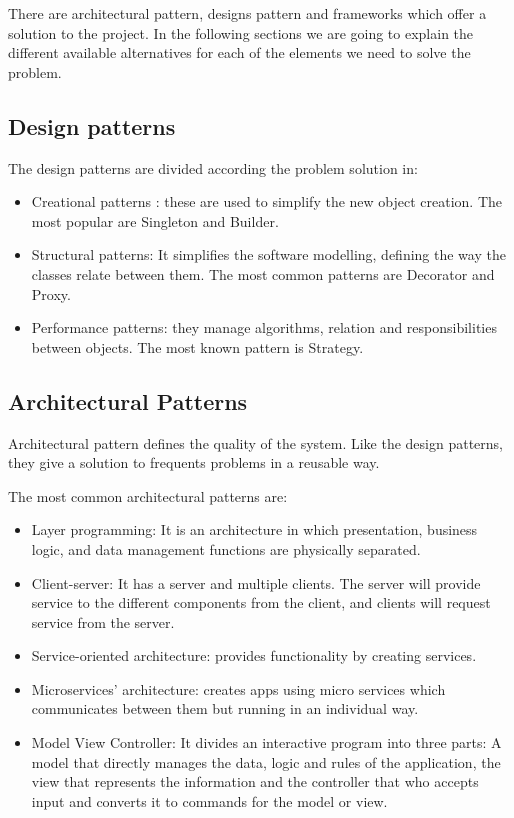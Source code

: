 \documentclass[12pt]{report} %
\begin{document}
There are architectural pattern, designs pattern and frameworks which offer a solution to the project. In the following sections we are going to explain the different available alternatives for each of the elements we need to solve the problem.


\subsection{Design patterns}

The design patterns are divided according the problem solution in:

\begin{itemize}
	\item Creational patterns : these are used to simplify the new object creation. The most popular are Singleton and Builder.
	\item Structural patterns: It simplifies the software modelling, defining the way the classes relate between them. The most common patterns are Decorator and Proxy.
	\item Performance patterns: they manage algorithms, relation and responsibilities between objects. The most known pattern is Strategy.	
\end{itemize}

\subsection{Architectural Patterns}

Architectural pattern defines the quality of the system. Like the design patterns, they give a solution to frequents problems in a reusable way. 

The most common architectural patterns are:
\begin{itemize}
	\item Layer programming: It is an architecture in which presentation, business logic, and data management functions are physically separated.
	\item Client-server: It has a server and multiple clients. The server will provide service to the different components from the client, and clients will request service from the server.
	\item Service-oriented architecture: provides functionality by creating services. 
	\item Microservices' architecture: creates apps using micro services which communicates between them but running in an individual way.
	\item Model View Controller:  It divides an interactive program into three parts: A model that directly manages the data, logic and rules of the application, the view that represents the information and the controller that who  accepts input and converts it to commands for the model or view.
	
\end{itemize}
\end{document}
